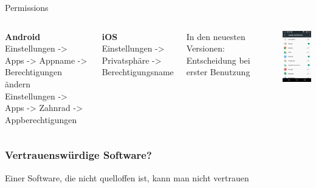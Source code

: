 \documentclass[12pt, xcolor={svgnames,table}]{beamer}
\begin{document}
\begin{frame}{Permissions}
  \begin{columns}
    \column{5.5cm}
    \footnotesize

    \textbf{Android}\\
    Einstellungen -> Apps -> Appname -> Berechtigungen ändern\\
    \vspace{0.2cm}
    Einstellungen -> Apps -> Zahnrad -> Appberechtigungen\\
    \vspace{0.5cm}

    \textbf{iOS}\\
    Einstellungen -> Privatsphäre -> Berechtigungsname\\
    \vspace{0.5cm}

    In den neuesten Versionen: Entscheidung bei erster Benutzung

    \column{5cm}

    \begin{center}
      \includegraphics[width=3.5cm]{img/permissions-android.png}
    \par\end{center}
  \end{columns}
\end{frame}

\begin{frame}
    \frametitle{Vertrauenswürdige Software?}
    \begin{center}\Large
        Einer Software, die nicht quelloffen ist, kann man nicht vertrauen
    \end{center}
\end{frame}
\end{document}
